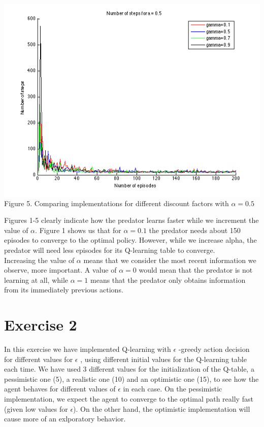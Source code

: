 \documentclass[a4paper,11pt]{article}
\begin{document}
\begin{center}
\includegraphics[width=1.0\textwidth,height=0.4\textheight]{a5.png}
\label{Figure 5}
Figure 5. 	Comparing implementations for different discount factors with $\alpha = 0.5$\vspace{1cm}
\end{center}
Figures 1-5 clearly indicate how the predator learns faster while we increment the value of $\alpha$. Figure 1 shows us that for $\alpha = 0.1$ the predator needs about 150 episodes to converge to the optimal policy. However, while we increase alpha, the predator will need less episodes for its Q-learning table to converge. \\
Increasing the value of $\alpha$ means that we consider the most recent information we observe, more important. A value of $\alpha = 0$ would mean that the predator is not learning at all, while $\alpha = 1$ means that the predator only obtains information from its immediately previous actions. 
 
\section*{Exercise 2}

In this exercise we have implemented Q-learning with $\epsilon$ -greedy action decision for different values for $\epsilon$ , using different initial values for the Q-learning table each time. We have used 3 different values for the initialization of the Q-table, a pessimistic one (5), a realistic one (10) and an optimistic one (15), to see how the agent behaves for different values of $\epsilon$ in each case. On the pessimistic implementation, we expect the agent to converge to the optimal path really fast (given low values for $\epsilon$). On the other hand, the optimistic implementation will cause more of an exlporatory behavior.
\end{document}
